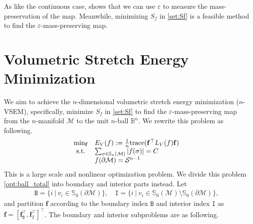 \documentclass{article}
\begin{document}
As like the continuous case,  shows that we can use $\varepsilon$ to measure the mass-preservation of the map. Meanwhile, minimizing $S_f$ in \eqref{set:Sf} is a feasible method to find the $\varepsilon$-mass-preserving map.




\section{Volumetric Stretch Energy Minimization}

We aim to achieve the $n$-dimensional volumetric stretch energy minimization ($n$-VSEM), specifically, minimize $S_f$ in \eqref{set:Sf} to find the $\varepsilon$-mass-preserving map from the $n$-manifold $\mathcal{M}$ to the unit $n$-ball $\mathbb{B}^n$. We rewrite this problem as following.
\begin{align} \label{opt:ball_total}
\begin{array}{l@{}c@{\quad}l}
    & \min_\mathbf{f} & E_V(f):=\frac{1}{n} \trace(\mathbf{f}^\top L_V(f) \mathbf{f})\\
    & \text{s.t.} & \sum_{\sigma\in \mathbb{S}_n(\mathcal{M})} |f(\sigma)| = C\\
    && f(\partial \mathcal{M}) = \mathcal{S}^{n-1}
\end{array}
\end{align}
This is a large scale and nonlinear optimization problem. We divide this problem \eqref{opt:ball_total} into boundary and interior parts instead.
Let
\begin{align}
    \mathtt{B} = \{ i~|~ v_i \in \mathbb{S}_0(\partial \mathcal{M})\}, \quad \mathtt{I} = \{ i~|~ v_i \in \mathbb{S}_0(\mathcal{M}) \setminus \mathbb{S}_0(\partial \mathcal{M})\},
\end{align}
and partition $\mathbf{f}$ according to the boundary index $\mathtt{B}$ and interior index $\mathtt{I}$ as $\mathbf{f} = [\mathbf{f}_\mathtt{B}^\top, \mathbf{f}_\mathtt{I}^\top]^\top$.
The boundary and interior subproblems are as following.
\end{document}
